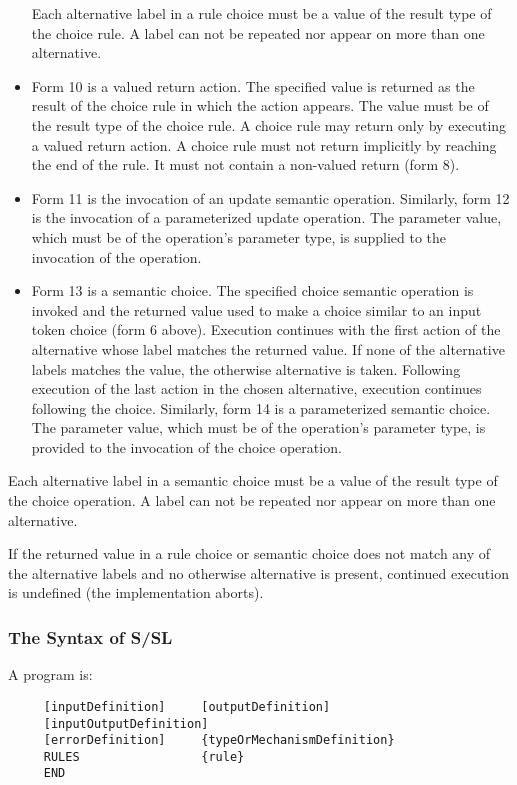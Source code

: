 \begin{itemize}
Each     alternative  label in a rule choice must be a value
of the result type of the choice rule.  A label can  not  be
repeated nor appear on more than one alternative.
\item Form 10 is a valued return action.         The specified value
is returned as the result of the choice rule  in  which  the
action appears.  The value must be of the result type of the
choice rule.  A choice rule may return only by  executing  a
valued return action.  A choice rule must not return 
implicitly by reaching the end of the rule.  It must not contain a
non-valued return (form 8).
\item Form 11 is the invocation of an update semantic 
operation.  Similarly, form 12 is the invocation of a 
parameterized  update  operation.  The parameter value, which must be
of the operation's parameter type, is supplied to the  
invocation of the operation.
\item Form 13 is  a  semantic  choice.  The specified choice
semantic operation is invoked and the returned value used to
make  a  choice  similar  to an input token choice (form 6
above).  Execution continues with the first  action  of  the
alternative whose label matches the returned value.  If none
of the alternative labels matches the value,  the  otherwise
alternative  is  taken.   Following  execution  of  the last
action in the chosen alternative, execution  continues  
following       the  choice.  Similarly, form 14 is a parameterized
semantic choice.  The parameter value, which must be of  the
operation's parameter type, is provided to the invocation of
the choice operation.
\end{itemize}

Each alternative label in a semantic     choice  must  be  a
value  of  the result type of the choice operation.  A label
can not be repeated nor appear on more than one alternative.

If the returned value in a rule choice or semantic choice
does not match any of the alternative labels and  no  
otherwise  alternative  is  present, continued execution is 
undefined (the implementation aborts).




\subsubsection{The Syntax of S/SL}

A program is:
\begin{verbatim}
     [inputDefinition]     [outputDefinition]
     [inputOutputDefinition]
     [errorDefinition]     {typeOrMechanismDefinition}
     RULES                 {rule}                  
     END
\end{verbatim}


